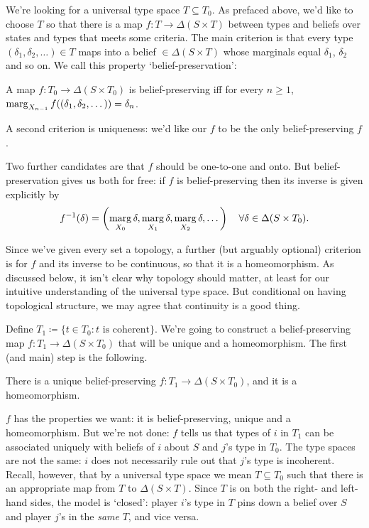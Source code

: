 \documentclass[11pt,letterpaper,reqno,oneside]{article}
\begin{document}
We're looking for a universal type space $T \subseteq T_0$. As prefaced above, we'd like to choose $T$ so that there is a map $f : T \to \Delta( S \times T )$ between types and beliefs over states and types that meets some criteria. The main criterion is that every type $(\delta_1,\delta_2,\dots) \in T$ maps into a belief $\in \Delta( S \times T )$ whose marginals equal $\delta_1$, $\delta_2$ and so on. We call this property `belief-preservation':
%
\begin{definition}
	A map $f : T_0 \to \Delta( S \times T_0 )$ is belief-preserving iff for every $n \geq 1$, $\operatorname*{marg}_{X_{n-1}} f((\delta_1,\delta_2,\dots)) = \delta_n$.
\end{definition}
%
\noindent A second criterion is uniqueness: we'd like our $f$ to be the only belief-preserving $f$.

Two further candidates are that $f$ should be one-to-one and onto. But belief-preservation gives us both for free: if $f$ is belief-preserving then its inverse is given explicitly by
%
\begin{equation*}
	f^{-1}(\delta) 
	= \left( \operatorname*{marg}_{X_0} \delta, 
	\operatorname*{marg}_{X_1} \delta, 
	\operatorname*{marg}_{X_2} \delta, \dots \right)
	\quad \forall \delta \in \Delta( S \times T_0 ) .
\end{equation*}


Since we've given every set a topology, a further (but arguably optional) criterion is for $f$ and its inverse to be continuous, so that it is a homeomorphism. As discussed below, it isn't clear why topology should matter, at least for our intuitive understanding of the universal type space. But conditional on having topological structure, we may agree that continuity is a good thing.


Define $T_1 \coloneqq \{ t \in T_0 : \text{$t$ is coherent} \}$. We're going to construct a belief-preserving map $f : T_1 \to \Delta( S \times T_0 )$ that will be unique and a homeomorphism. The first (and main) step is the following.
%
\begin{proposition}
	\label{proposition:BD93_1}
	There is a unique belief-preserving $f : T_1 \to \Delta( S \times T_0 )$, and it is a homeomorphism.
\end{proposition}

$f$ has the properties we want: it is belief-preserving, unique and a homeomorphism. But we're not done: $f$ tells us that types of $i$ in $T_1$ can be associated uniquely with beliefs of $i$ about $S$ and $j$'s type in $T_0$. The type spaces are not the same: $i$ does not necessarily rule out that $j$'s type is incoherent. Recall, however, that by a universal type space we mean $T \subseteq T_0$ such that there is an appropriate map from $T$ to $\Delta( S \times T )$. Since $T$ is on both the right- and left-hand sides, the model is `closed': player $i$'s type in $T$ pins down a belief over $S$ and player $j$'s in the \emph{same} $T$, and vice versa.
\end{document}
